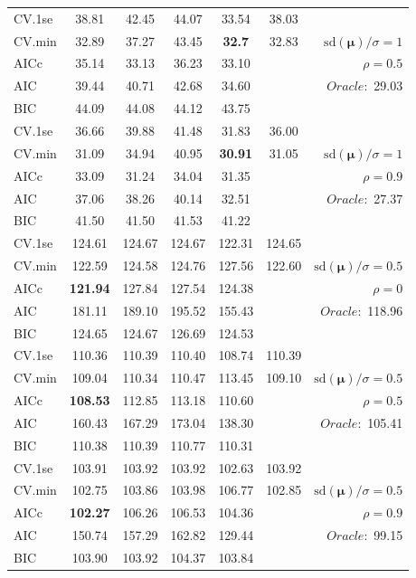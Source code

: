 \begin{table}
\begin{center}
\begin{tabular}{l*{5}{c}|r}
 \hline 
CV.1se & 38.81 & 42.45 & 44.07 & 33.54 & 38.03 & \\
CV.min & 32.89 & 37.27 & 43.45 & {\bf 32.7} & 32.83 &  $\mathrm{sd}(\mathbf{\mu})/\sigma=1$ \\
AICc & 35.14 & 33.13 & 36.23 & 33.10 & & $\rho=0.5$ \\
AIC & 39.44 & 40.71 & 42.68 & 34.60 & &  \multirow{2}{*}{$Oracle: $ 29.03} \\
BIC & 44.09 & 44.08 & 44.12 & 43.75 & &  \\
 \hline 
CV.1se & 36.66 & 39.88 & 41.48 & 31.83 & 36.00 & \\
CV.min & 31.09 & 34.94 & 40.95 & {\bf 30.91} & 31.05 &  $\mathrm{sd}(\mathbf{\mu})/\sigma=1$ \\
AICc & 33.09 & 31.24 & 34.04 & 31.35 & & $\rho=0.9$ \\
AIC & 37.06 & 38.26 & 40.14 & 32.51 & &  \multirow{2}{*}{$Oracle: $ 27.37} \\
BIC & 41.50 & 41.50 & 41.53 & 41.22 & &  \\
 \hline 
CV.1se & 124.61 & 124.67 & 124.67 & 122.31 & 124.65 & \\
CV.min & 122.59 & 124.58 & 124.76 & 127.56 & 122.60 &  $\mathrm{sd}(\mathbf{\mu})/\sigma=0.5$ \\
AICc & {\bf 121.94} & 127.84 & 127.54 & 124.38 & & $\rho=0$ \\
AIC & 181.11 & 189.10 & 195.52 & 155.43 & &  \multirow{2}{*}{$Oracle: $ 118.96} \\
BIC & 124.65 & 124.67 & 126.69 & 124.53 & &  \\
 \hline 
CV.1se & 110.36 & 110.39 & 110.40 & 108.74 & 110.39 & \\
CV.min & 109.04 & 110.34 & 110.47 & 113.45 & 109.10 &  $\mathrm{sd}(\mathbf{\mu})/\sigma=0.5$ \\
AICc & {\bf 108.53} & 112.85 & 113.18 & 110.60 & & $\rho=0.5$ \\
AIC & 160.43 & 167.29 & 173.04 & 138.30 & &  \multirow{2}{*}{$Oracle: $ 105.41} \\
BIC & 110.38 & 110.39 & 110.77 & 110.31 & &  \\
 \hline 
CV.1se & 103.91 & 103.92 & 103.92 & 102.63 & 103.92 & \\
CV.min & 102.75 & 103.86 & 103.98 & 106.77 & 102.85 &  $\mathrm{sd}(\mathbf{\mu})/\sigma=0.5$ \\
AICc & {\bf 102.27} & 106.26 & 106.53 & 104.36 & & $\rho=0.9$ \\
AIC & 150.74 & 157.29 & 162.82 & 129.44 & &  \multirow{2}{*}{$Oracle: $ 99.15} \\
BIC & 103.90 & 103.92 & 104.37 & 103.84 & &  \\
 \hline 
\end{tabular}
\end{center}
\vspace{-1cm}
\end{table}




